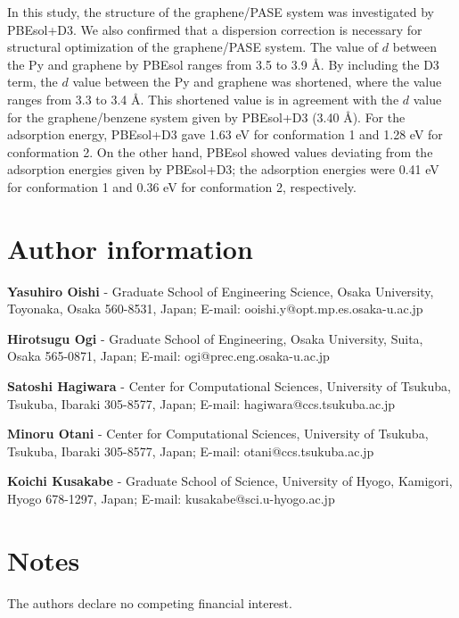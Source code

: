 \documentclass[journal=acsodf,manuscript=article]{achemso}
\begin{document}
In this study, the structure of the graphene/PASE system was investigated by PBEsol+D3. We also confirmed that a dispersion correction is necessary for structural optimization of the graphene/PASE system. The value of $d$ between the Py and graphene by PBEsol ranges from 3.5 to 3.9 {\AA}. By including the D3 term, the $d$ value between the Py and graphene was shortened, where the value ranges from 3.3 to 3.4 {\AA}. This shortened value is in agreement with the $d$ value for the graphene/benzene system given by PBEsol+D3 (3.40 \AA). For the adsorption energy, PBEsol+D3 gave 1.63 eV for conformation 1 and 1.28 eV for conformation 2. On the other hand, PBEsol showed values deviating from the adsorption energies given by PBEsol+D3; the adsorption energies were 0.41 eV for conformation 1 and 0.36 eV for conformation 2, respectively.


\section*{Author information}

\textbf{Yasuhiro Oishi} - Graduate School of Engineering Science, Osaka University, Toyonaka, Osaka 560-8531, Japan; E-mail: ooishi.y@opt.mp.es.osaka-u.ac.jp

\textbf{Hirotsugu Ogi} - Graduate School of Engineering, Osaka University, Suita, Osaka 565-0871, Japan;
E-mail: ogi@prec.eng.osaka-u.ac.jp

\textbf{Satoshi Hagiwara} - Center for Computational Sciences, University of Tsukuba, Tsukuba, Ibaraki 305-8577, Japan; E-mail: hagiwara@ccs.tsukuba.ac.jp

\textbf{Minoru Otani} - Center for Computational Sciences, University of Tsukuba, Tsukuba, Ibaraki 305-8577, Japan; E-mail: otani@ccs.tsukuba.ac.jp

\textbf{Koichi Kusakabe} - Graduate School of Science, University of Hyogo, Kamigori, Hyogo 678-1297, Japan; E-mail: kusakabe@sci.u-hyogo.ac.jp

\section*{Notes}
The authors declare no competing financial interest.
\end{document}
